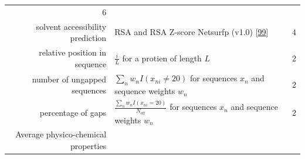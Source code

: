 \documentclass[12pt,a4paper,twoside]{book}
\theoremstyle{definition}
\theoremstyle{definition}
\theoremstyle{remark}
\begin{document}
\begin{longtable}[]{@{}rlc@{}}
\begin{minipage}[t]{0.18\columnwidth}
6\strut
\end{minipage}\tabularnewline
\begin{minipage}[t]{0.23\columnwidth}\raggedleft\strut
solvent accessibility prediction\strut
\end{minipage} & \begin{minipage}[t]{0.50\columnwidth}\raggedright\strut
RSA and RSA Z-score Netsurfp (v1.0)
{[}\protect\hyperlink{ref-Petersen2009a}{99}{]}\strut
\end{minipage} & \begin{minipage}[t]{0.18\columnwidth}\centering\strut
4\strut
\end{minipage}\tabularnewline
\begin{minipage}[t]{0.23\columnwidth}\raggedleft\strut
relative position in sequence\strut
\end{minipage} & \begin{minipage}[t]{0.50\columnwidth}\raggedright\strut
\(\frac{i}{L}\) for a protien of length \(L\)\strut
\end{minipage} & \begin{minipage}[t]{0.18\columnwidth}\centering\strut
2\strut
\end{minipage}\tabularnewline
\begin{minipage}[t]{0.23\columnwidth}\raggedleft\strut
number of ungapped sequences\strut
\end{minipage} & \begin{minipage}[t]{0.50\columnwidth}\raggedright\strut
\(\sum_n w_n I(x_{ni} \neq 20)\) for sequences \(x_n\) and sequence
weights \(w_n\)\strut
\end{minipage} & \begin{minipage}[t]{0.18\columnwidth}\centering\strut
2\strut
\end{minipage}\tabularnewline
\begin{minipage}[t]{0.23\columnwidth}\raggedleft\strut
percentage of gaps\strut
\end{minipage} & \begin{minipage}[t]{0.50\columnwidth}\raggedright\strut
\(\frac{\sum_n w_n I(x_{ni} = 20)}{N_{\text{eff}}}\) for sequences
\(x_n\) and sequence weights \(w_n\)\strut
\end{minipage} & \begin{minipage}[t]{0.18\columnwidth}\centering\strut
2\strut
\end{minipage}\tabularnewline
\begin{minipage}[t]{0.23\columnwidth}\raggedleft\strut
Average physico-chemical properties\strut

\end{minipage}
\end{longtable}
\end{document}
